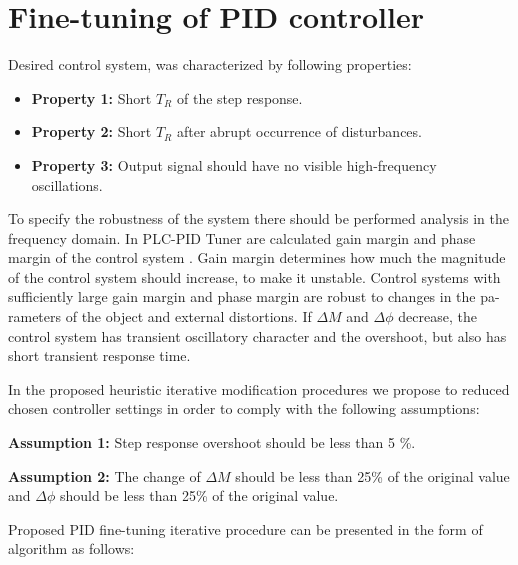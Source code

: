 \documentclass{amcs}
\begin{document}
\section{Fine-tuning of PID controller}
%
Desired control system, was characterized by following properties:

\begin{itemize}
\item \textbf{Property 1:} Short $T_{R}$ of the step response.
\item \textbf{Property 2:} Short $T_{R}$  after abrupt occurrence of disturbances.
\item \textbf{Property 3:} Output signal should have no visible high-frequency oscillations.
\end{itemize}

To specify the robustness of the system there should be performed analysis in the frequency domain. In PLC-PID Tuner are calculated gain margin and phase margin of the control system \cite{Mozaryn:2016}. Gain margin determines how much the magnitude of the control system should increase, to make it unstable. Control systems with sufficiently large gain margin and phase margin are robust to changes in the pa-rameters of the object and external distortions. If $\Delta M$  and $\Delta \phi$ decrease, the control system has transient oscillatory character and the overshoot, but also has short transient response time. 

In the proposed heuristic iterative modification procedures we propose to reduced chosen controller settings in order to comply with the following assumptions:

\textbf{Assumption 1:} Step response overshoot should be less than 5 \%.

\textbf{Assumption 2:} The change of $\Delta M$  should be less than 25\% of the original value and $\Delta \phi$ should be less than 25\% of the original value. 

Proposed PID fine-tuning iterative procedure can be presented in the form of algorithm as follows:
\end{document}
